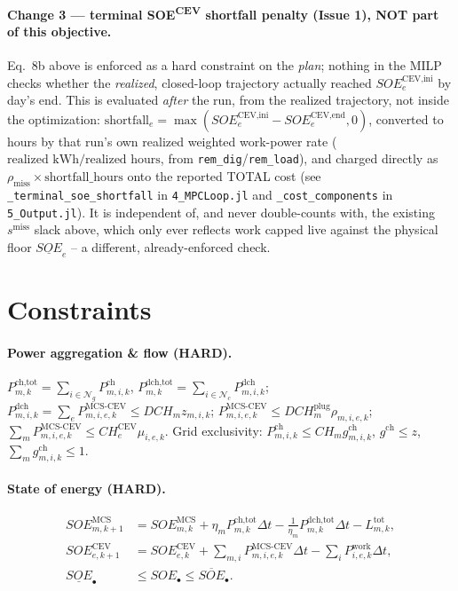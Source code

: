 \documentclass[11pt]{article}
\newcommand{\dt}{\Delta t}
\begin{document}
\paragraph{Change 3 --- terminal SOE\textsuperscript{CEV} shortfall penalty (Issue 1), NOT part of
this objective.} Eq.~8b above is enforced as a hard constraint on the \emph{plan}; nothing in the
MILP checks whether the \emph{realized}, closed-loop trajectory actually reached
$SOE^{\text{CEV,ini}}_e$ by day's end. This is evaluated \emph{after} the run, from the realized
trajectory, not inside the optimization: $\text{shortfall}_e=\max(SOE^{\text{CEV,ini}}_e-
SOE^{\text{CEV,end}}_e,0)$, converted to hours by that run's own realized weighted work-power rate
($\text{realized kWh}/\text{realized hours}$, from \texttt{rem\_dig}/\texttt{rem\_load}), and
charged directly as $\rho_{\text{miss}}\times\text{shortfall\_hours}$ onto the reported TOTAL cost
(see \texttt{\_terminal\_soe\_shortfall} in \texttt{4\_MPCLoop.jl} and \texttt{\_cost\_components}
in \texttt{5\_Output.jl}). It is independent of, and never double-counts with, the existing
$s^{\text{miss}}$ slack above, which only ever reflects work capped live against the physical floor
$\underline{SOE}_e$ -- a different, already-enforced check.


\section{Constraints}

\paragraph{Power aggregation \& flow (HARD).}
$P^{\text{ch,tot}}_{m,k}=\sum_{i\in\mathcal{N}_g}P^{\text{ch}}_{m,i,k}$,
$P^{\text{dch,tot}}_{m,k}=\sum_{i\in\mathcal{N}_c}P^{\text{dch}}_{m,i,k}$;
$P^{\text{dch}}_{m,i,k}=\sum_e P^{\text{MCS-CEV}}_{m,i,e,k}\le DCH_m z_{m,i,k}$;
$P^{\text{MCS-CEV}}_{m,i,e,k}\le DCH^{\text{plug}}_m\rho_{m,i,e,k}$;
$\sum_m P^{\text{MCS-CEV}}_{m,i,e,k}\le CH^{\text{CEV}}_e\mu_{i,e,k}$.
Grid exclusivity: $P^{\text{ch}}_{m,i,k}\le CH_m g^{\text{ch}}_{m,i,k}$,
$g^{\text{ch}}\le z$, $\sum_m g^{\text{ch}}_{m,i,k}\le 1$.

\paragraph{State of energy (HARD).}
\begin{align}
SOE^{\text{MCS}}_{m,k+1}&=SOE^{\text{MCS}}_{m,k}+\eta_m P^{\text{ch,tot}}_{m,k}\dt-\tfrac{1}{\eta_m}P^{\text{dch,tot}}_{m,k}\dt-L^{\text{tot}}_{m,k},\\
SOE^{\text{CEV}}_{e,k+1}&=SOE^{\text{CEV}}_{e,k}+\textstyle\sum_{m,i}P^{\text{MCS-CEV}}_{m,i,e,k}\dt-\sum_i P^{\text{work}}_{i,e,k}\dt,\\
\underline{SOE}_\bullet&\le SOE_\bullet\le\overline{SOE}_\bullet .
\end{align}
\end{document}
